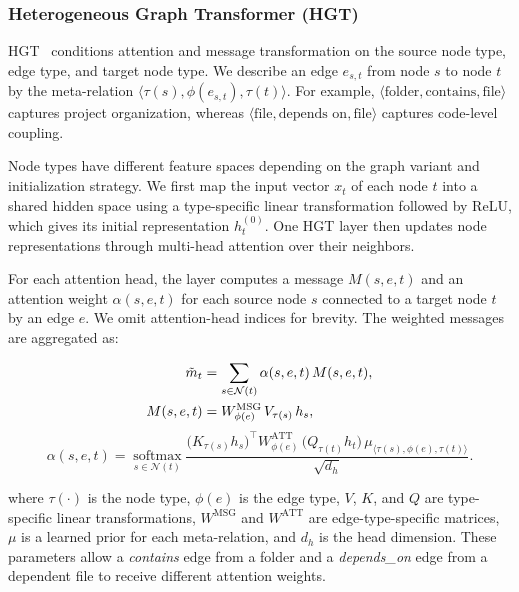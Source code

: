 \subsubsection{Heterogeneous Graph Transformer (HGT)\label{sec:hgt_model}}

HGT~\cite{hgt} conditions attention and message transformation on the source node type, edge type, and target node type. We describe an edge $e_{s,t}$ from node $s$ to node $t$ by the meta-relation $\langle \tau(s), \phi(e_{s,t}), \tau(t) \rangle$. For example, $\langle \text{folder}, \text{contains}, \text{file} \rangle$ captures project organization, whereas $\langle \text{file}, \text{depends on}, \text{file} \rangle$ captures code-level coupling.

Node types have different feature spaces depending on the graph variant and initialization strategy. We first map the input vector $x_t$ of each node $t$ into a shared hidden space using a type-specific linear transformation followed by ReLU, which gives its initial representation $h_t^{(0)}$. One HGT layer then updates node representations through multi-head attention over their neighbors.

For each attention head, the layer computes a message $M(s,e,t)$ and an attention weight $\alpha(s,e,t)$ for each source node $s$ connected to a target node $t$ by an edge $e$. We omit attention-head indices for brevity. The weighted messages are aggregated as:

\begin{align}
\tilde{m}_t &= \sum_{s \in \mathcal{N}(t)}
       \alpha(s,e,t)\, M(s,e,t), \\
M(s,e,t) &= W^{\mathrm{MSG}}_{\phi(e)}\,
            V_{\tau(s)}\, h_s, \notag
\end{align}
\begingroup
\fontsize{9.5pt}{12pt}\selectfont
\begin{equation*}
\alpha(s,e,t)
= \operatorname*{softmax}_{s \in \mathcal{N}(t)}
\frac{
  \big(K_{\tau(s)} h_s\big)^{\top}
  W^{\mathrm{ATT}}_{\phi(e)}\,
  \big(Q_{\tau(t)} h_t\big)\,
  \mu_{\langle \tau(s),\phi(e),\tau(t)\rangle}
}{\sqrt{d_h}}.
\end{equation*}
\endgroup

where $\tau(\cdot)$ is the node type, $\phi(e)$ is the edge type, $V$, $K$, and $Q$ are type-specific linear transformations, $W^{\mathrm{MSG}}$ and $W^{\mathrm{ATT}}$ are edge-type-specific matrices, $\mu$ is a learned prior for each meta-relation, and $d_h$ is the head dimension. These parameters allow a \emph{contains} edge from a folder and a \emph{depends\_on} edge from a dependent file to receive different attention weights.

